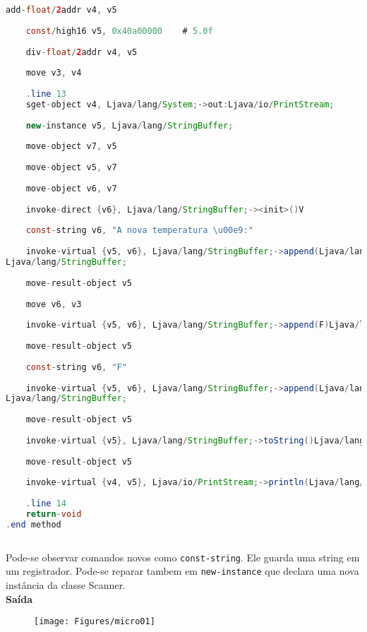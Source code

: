 \documentclass[hidelinks,12pt]{article}
\begin{document}
\begin{lstlisting}[caption=Smali resultante do .java,language=java]
	add-float/2addr v4, v5
	
	const/high16 v5, 0x40a00000    # 5.0f
	
	div-float/2addr v4, v5
	
	move v3, v4
	
	.line 13
	sget-object v4, Ljava/lang/System;->out:Ljava/io/PrintStream;
	
	new-instance v5, Ljava/lang/StringBuffer;
	
	move-object v7, v5
	
	move-object v5, v7
	
	move-object v6, v7
	
	invoke-direct {v6}, Ljava/lang/StringBuffer;-><init>()V
	
	const-string v6, "A nova temperatura \u00e9:"
	
	invoke-virtual {v5, v6}, Ljava/lang/StringBuffer;->append(Ljava/lang/String;)
Ljava/lang/StringBuffer;
	
	move-result-object v5
	
	move v6, v3
	
	invoke-virtual {v5, v6}, Ljava/lang/StringBuffer;->append(F)Ljava/lang/StringBuffer;
	
	move-result-object v5
	
	const-string v6, "F"
	
	invoke-virtual {v5, v6}, Ljava/lang/StringBuffer;->append(Ljava/lang/String;)
Ljava/lang/StringBuffer;
	
	move-result-object v5
	
	invoke-virtual {v5}, Ljava/lang/StringBuffer;->toString()Ljava/lang/String;
	
	move-result-object v5
	
	invoke-virtual {v4, v5}, Ljava/io/PrintStream;->println(Ljava/lang/String;)V
	
	.line 14
	return-void
.end method	
	
	\end{lstlisting}
	
	Pode-se observar comandos novos como \texttt{const-string}. Ele guarda uma string em um registrador. Pode-se reparar tambem em \texttt{new-instance} que declara uma nova instância da classe Scanner.\\ 
	
	{\large{\textbf{Saída}}}
	
	\begin{figure}[!h]
		\centering
		\texttt{[image: Figures/micro01]}
	\end{figure}
	
\end{document}
